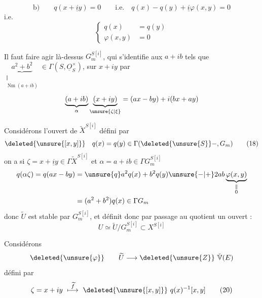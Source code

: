 \[
\text{b)}\qquad q(x+\underline i y)=0\qquad\text{i.e.}\quad q(x)-q(y)+\underline i\varphi(x,y)=0
\]
i.e.
\[
\left\{\begin{aligned}q(x)&=q(y)\\\varphi(x,y)&=0\end{aligned}\right.\tag*{(17)}
\]

Il faut faire agir là-dessus $G_m^{S[i]}$, qui s'identifie aux $a+ib$ tels que $\underbrace{a^2+b^2}_{\substack{\Vert\\\operatorname{Nm}(a+ib)}}\in\Gamma(S,\underline O_S^\times)$,  sur $x+iy$ par
\[
\underbrace{(a+ib)}_{\alpha}\underbrace{(x+iy)}_{\unsure{\zeta|\xi}}=(ax-by)+i(bx+ay)
\]

Considérons l'ouvert  de $\widetilde X^{S[i]}$ défini par
\[
\deleted{\unsure{[x,y]}}\quad q(x)=q(y)\in\Gamma(\deleted{\unsure{S}}-,G_m)\tag*{(18)}
\]
on a si $\zeta=x+\underline i y\in\Gamma\widetilde X^{S[i]}$ et $\alpha=a+ib\in\Gamma G_m^{S[i]}$
\[
\begin{aligned}q(\alpha\zeta)=q(ax-by)&=\unsure{q}a^2q(x)+b^2q(y)\unsure{-|+}2ab\underbrace{\varphi(x,y)}_{\substack{\Vert\\0}}\\&=(a^2+b^2)q(x)\in\Gamma G_m\end{aligned}
\]
donc $\widetilde U$ est stable par $G_m^{S[i]}$, et définit donc  par passage au quotient un ouvert :
\[
U\simeq\widetilde U/G_m^{S[i]}\subset X^{S[i]}\tag*{(19)}
\]

Considérons
\[
\deleted{\unsure{\varphi}}\qquad\widetilde U\longrightarrow\deleted{\unsure{Z}}\ \check{\mathbb V}(E)
\]
défini par
\[
\zeta=x+iy\ \overset{\widetilde f}{\longmapsto}\ \deleted{\unsure{[x,y]}}\ q(x)^{-1}[x,y]\tag*{(20)}
\]

